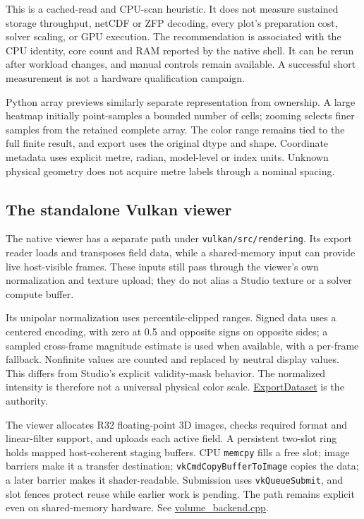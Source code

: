 \documentclass[
  11pt,
]{article}
\begin{document}
This is a cached-read and CPU-scan heuristic. It does not measure sustained
storage throughput, netCDF or ZFP decoding, every plot's preparation cost,
solver scaling, or GPU execution. The recommendation is associated with the
CPU identity, core count and RAM reported by the native shell. It can be rerun
after workload changes, and manual controls remain available. A successful
short measurement is not a hardware qualification campaign.

Python array previews similarly separate representation from ownership. A
large heatmap initially point-samples a bounded number of cells; zooming selects
finer samples from the retained complete array. The color range remains tied to
the full finite result, and export uses the original dtype and shape. Coordinate
metadata uses explicit metre, radian, model-level or index units. Unknown
physical geometry does not acquire metre labels through a nominal spacing.

\subsection{The standalone Vulkan
viewer}\label{the-standalone-vulkan-viewer}

The native viewer has a separate path under
\texttt{vulkan/src/rendering}. Its export reader loads and transposes
field data, while a shared-memory input can provide live host-visible
frames. These inputs still pass through the viewer's own normalization
and texture upload; they do not alias a Studio texture or a solver
compute buffer.

Its unipolar normalization uses percentile-clipped ranges. Signed data
uses a centered encoding, with zero at 0.5 and opposite signs on
opposite sides; a sampled cross-frame magnitude estimate is used when
available, with a per-frame fallback. Nonfinite values are counted and
replaced by neutral display values. This differs from Studio's explicit
validity-mask behavior. The normalized intensity is therefore not a
universal physical color scale.
\href{../vulkan/src/data/export_dataset.cpp}{ExportDataset} is the
authority.

The viewer allocates R32 floating-point 3D images, checks required
format and linear-filter support, and uploads each active field. A
persistent two-slot ring holds mapped host-coherent staging buffers. CPU
\texttt{memcpy} fills a free slot; image barriers make it a transfer
destination; \texttt{vkCmdCopyBufferToImage} copies the data; a later
barrier makes it shader-readable. Submission uses
\texttt{vkQueueSubmit}, and slot fences protect reuse while earlier work
is pending. The path remains explicit even on shared-memory hardware.
See
\href{../vulkan/src/rendering/volume_backend.cpp}{volume\_backend.cpp}.
\end{document}
